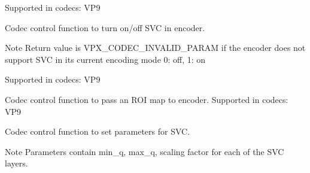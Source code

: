 \begin{Desc}
\begin{description}
Supported in codecs\+: V\+P9 \item[{\em 
V\+P9\+E\+\_\+\+S\+E\+T\+\_\+\+S\+VC\hypertarget{group__vp8__encoder_gga6deae3d561c838952552c3d3756322eca88f29897083911e08434857aeff77407}{}\label{group__vp8__encoder_gga6deae3d561c838952552c3d3756322eca88f29897083911e08434857aeff77407}
}]Codec control function to turn on/off S\+VC in encoder. \begin{DoxyNote}{Note}
Return value is V\+P\+X\+\_\+\+C\+O\+D\+E\+C\+\_\+\+I\+N\+V\+A\+L\+I\+D\+\_\+\+P\+A\+R\+AM if the encoder does not support S\+VC in its current encoding mode 0\+: off, 1\+: on
\end{DoxyNote}
Supported in codecs\+: V\+P9 \item[{\em 
V\+P9\+E\+\_\+\+S\+E\+T\+\_\+\+R\+O\+I\+\_\+\+M\+AP\hypertarget{group__vp8__encoder_gga6deae3d561c838952552c3d3756322eca238a2ff6df22a651f6ef251ea0d81715}{}\label{group__vp8__encoder_gga6deae3d561c838952552c3d3756322eca238a2ff6df22a651f6ef251ea0d81715}
}]Codec control function to pass an R\+OI map to encoder. Supported in codecs\+: V\+P9 \item[{\em 
V\+P9\+E\+\_\+\+S\+E\+T\+\_\+\+S\+V\+C\+\_\+\+P\+A\+R\+A\+M\+E\+T\+E\+RS\hypertarget{group__vp8__encoder_gga6deae3d561c838952552c3d3756322eca7836375eec7f50dc580a2a8ace9c9055}{}\label{group__vp8__encoder_gga6deae3d561c838952552c3d3756322eca7836375eec7f50dc580a2a8ace9c9055}
}]Codec control function to set parameters for S\+VC. \begin{DoxyNote}{Note}
Parameters contain min\+\_\+q, max\+\_\+q, scaling factor for each of the S\+VC layers.

\end{DoxyNote}
\end{description}
\end{Desc}
